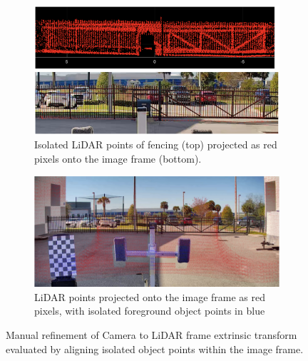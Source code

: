 \begin{figure}[htbp]
    \centering
    \begin{subfigure}{0.85\textwidth}
        \centering
        \includegraphics[width=\textwidth]{Images/LiDAR_calib_fence.png}
        \caption{Isolated LiDAR points of fencing (top) projected as red pixels onto the image frame (bottom).}
        \label{fig:LiDAR_calib_fence}
    \end{subfigure}
    
    \vspace{0.5em} %

    \begin{subfigure}{0.85\textwidth}
        \centering
        \includegraphics[width=\textwidth]{Images/LiDAR_calib_composite.png}
        \caption{LiDAR points projected onto the image frame as red pixels, with isolated foreground object points in blue}
        \label{fig:LiDAR_calib_composite}
    \end{subfigure}

    \caption{Manual refinement of Camera to LiDAR frame extrinsic transform evaluated by aligning isolated object points within the image frame.}
    \label{fig:LiDAR_calib_combined}
\end{figure}

